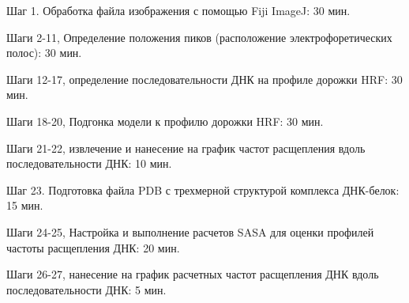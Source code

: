     Шаг 1. Обработка файла изображения с помощью Fiji ImageJ: 30 мин.

    Шаги 2-11, Определение положения пиков (расположение электрофоретических полос): 30 мин.

    Шаги 12-17, определение последовательности ДНК на профиле дорожки HRF: 30 мин.

    Шаги 18-20, Подгонка модели к профилю дорожки HRF: 30 мин.

    Шаги 21-22, извлечение и нанесение на график частот расщепления вдоль последовательности ДНК: 10 мин.

    Шаг 23. Подготовка файла PDB с трехмерной структурой комплекса ДНК-белок: 15 мин.

    Шаги 24-25, Настройка и выполнение расчетов SASA для оценки профилей частоты расщепления ДНК: 20 мин.

    Шаги 26-27, нанесение на график расчетных частот расщепления ДНК вдоль последовательности ДНК: 5 мин.
    
    
